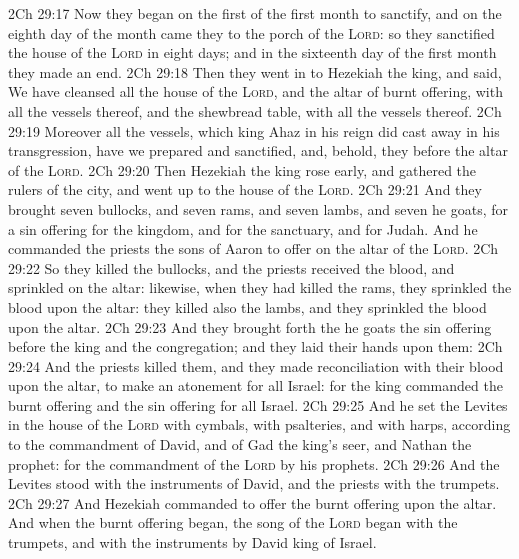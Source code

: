 \vs 2Ch 29:17 Now they began on the first  of the first month to sanctify, and on the eighth day of the month came they to the porch of the \textsc{Lord}: so they sanctified the house of the \textsc{Lord} in eight days; and in the sixteenth day of the first month they made an end.
\vs 2Ch 29:18 Then they went in to Hezekiah the king, and said, We have cleansed all the house of the \textsc{Lord}, and the altar of burnt offering, with all the vessels thereof, and the shewbread table, with all the vessels thereof.
\vs 2Ch 29:19 Moreover all the vessels, which king Ahaz in his reign did cast away in his transgression, have we prepared and sanctified, and, behold, they  before the altar of the \textsc{Lord}.
\vs 2Ch 29:20 Then Hezekiah the king rose early, and gathered the rulers of the city, and went up to the house of the \textsc{Lord}.
\vs 2Ch 29:21 And they brought seven bullocks, and seven rams, and seven lambs, and seven he goats, for a sin offering for the kingdom, and for the sanctuary, and for Judah. And he commanded the priests the sons of Aaron to offer  on the altar of the \textsc{Lord}.
\vs 2Ch 29:22 So they killed the bullocks, and the priests received the blood, and sprinkled  on the altar: likewise, when they had killed the rams, they sprinkled the blood upon the altar: they killed also the lambs, and they sprinkled the blood upon the altar.
\vs 2Ch 29:23 And they brought forth the he goats  the sin offering before the king and the congregation; and they laid their hands upon them:
\vs 2Ch 29:24 And the priests killed them, and they made reconciliation with their blood upon the altar, to make an atonement for all Israel: for the king commanded  the burnt offering and the sin offering  for all Israel.
\vs 2Ch 29:25 And he set the Levites in the house of the \textsc{Lord} with cymbals, with psalteries, and with harps, according to the commandment of David, and of Gad the king's seer, and Nathan the prophet: for  the commandment of the \textsc{Lord} by his prophets.
\vs 2Ch 29:26 And the Levites stood with the instruments of David, and the priests with the trumpets.
\vs 2Ch 29:27 And Hezekiah commanded to offer the burnt offering upon the altar. And when the burnt offering began, the song of the \textsc{Lord} began  with the trumpets, and with the instruments  by David king of Israel.
